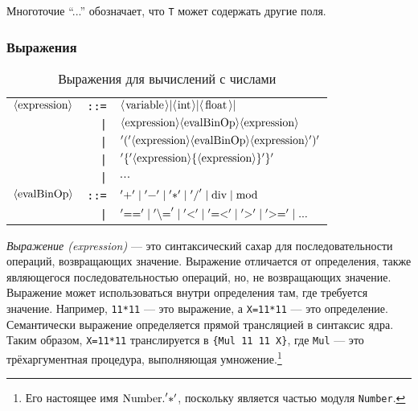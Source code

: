 Многоточие ``...'' обозначает, что \lstinline|T| может содержать другие поля.



\subsubsection{Выражения}

\begin{table}
  \begin{tabular}{|lrl|}
    \hline
    $\langle \text{\lstinline|expression|} \rangle$ & \lstinline|::=| & $\langle \text{\lstinline|variable|} \rangle | \langle \text{\lstinline|int|} \rangle | \langle \text{\lstinline|float|} \rangle |$\\
    & \lstinline!|! & $\langle \text{\lstinline|expression|} \rangle \langle \text{\lstinline|evalBinOp|} \rangle \langle \text{\lstinline|expression|} \rangle$\\
    & \lstinline!|! & $'(' \langle \text{\lstinline|expression|} \rangle \langle \text{\lstinline|evalBinOp|} \rangle \langle \text{\lstinline|expression|} \rangle ')'$\\
    & \lstinline!|! & $'\{' \langle \text{\lstinline|expression|} \rangle \{ \langle \text{\lstinline|expression|} \rangle \} '\}'$\\
    & \lstinline!|! & $...$\\
    $\langle \text{\lstinline|evalBinOp|} \rangle$ & \lstinline|::=| & $'\text{\lstinline|+|}' \;|\; '\text{\lstinline|-|}' \;|\; '\text{\lstinline|*|}' \;|\; '\text{\lstinline|/|}' \;|\; \text{\lstinline|div|} \;|\; \text{\lstinline|mod|}$\\
    & \lstinline!|! & $ '\text{\lstinline|==|}' \;|\; '\text{\lstinline|\\=|}' \;|\; '\text{\lstinline|<|}' \;|\; '\text{\lstinline|=<|}' \;|\; '\text{\lstinline|>|}' \;|\; '\text{\lstinline|>=|}' \;|\; ... $\\
    \hline
  \end{tabular}
  
\caption{Выражения для вычислений с числами}
\label{table:expressions_for_calculating_with_numbers}
\end{table}

\emph{Выражение (expression)} --- это синтаксический сахар для последовательности операций, возвращающих значение. Выражение отличается от определения, также являющегося последовательностью операций, но, не возвращающих значение. Выражение может использоваться внутри определения там, где требуется значение. Например, \lstinline|11*11| --- это выражение, а \lstinline|X=11*11| --- это определение. Семантически выражение определяется прямой трансляцией в синтаксис ядра. Таким образом, \lstinline|X=11*11| транслируется в \lstinline|{Mul 11 11 X}|, где \lstinline|Mul| --- это трёхаргументная процедура, выполняющая умножение.\footnote{Его настоящее имя $\text{\lstinline|Number.|} ' \text{\lstinline|*|} '$, поскольку является частью модуля \lstinline|Number|.}

